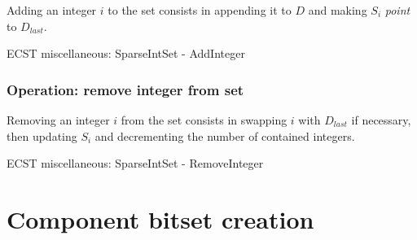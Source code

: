 \documentclass[twoside, 12pt, a4paper, openany]{book}
\begin{document}
Adding an integer \(i\) to the set consists in appending it to \(D\) and
making \(S_i\) \emph{point} to \(D_{last}\).

\begin{algorithm}[H]

\caption{ECST miscellaneous: SparseIntSet - AddInteger}
\footnotesize



\end{algorithm}

\subsubsection{Operation: remove integer from
set}\label{operation-remove-integer-from-set}

Removing an integer \(i\) from the set consists in swapping \(i\) with
\(D_{last}\) if necessary, then updating \(S_i\) and decrementing the
number of contained integers.

\begin{algorithm}[H]

\caption{ECST miscellaneous: SparseIntSet - RemoveInteger}
\footnotesize



\end{algorithm}

\hypertarget{appendix_component_bitset_creation}{\section{Component
bitset creation}\label{appendix_component_bitset_creation}}
\end{document}
